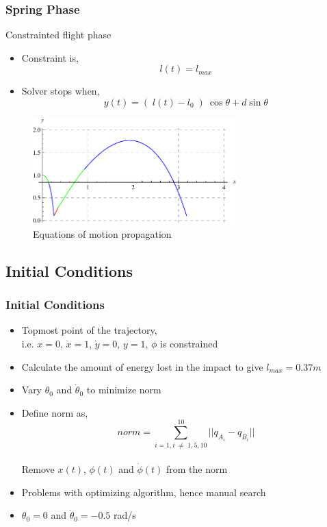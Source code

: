 \begin{frame}
\frametitle{Spring Phase}
\begin{block}{Constrainted flight phase}
\begin{itemize}
  \item
  Constraint is,
  \begin{equation*}
  l(t) = l_{max}
  \end{equation*}
  \item
  Solver stops when,
  \begin{equation*}
  y(t) = (\;l(t) - l_0\;)\:\cos \theta + d \sin \theta
  \end{equation*}

\end{itemize}
\end{block}
\vspace{0.1in}
\begin{figure}
\centering
\includegraphics[width=0.7\textwidth]{fig/plotG.pdf}
\caption{Equations of motion propagation}
\end{figure}
\end{frame}

\subsection*{Initial Conditions}
\begin{frame}
\frametitle{Initial Conditions}
\begin{itemize}
  \item 
  Topmost point of the trajectory,\\ i.e. $x = 0$, $\dot{x} = 1$, $\dot{y} = 0$, $y = 1$, $\phi$ is constrained\\[0.1in]
  \item
  Calculate the amount of energy lost in the impact to give $l_{max} = 0.37 m$\\[0.1in]
  \item
  Vary $\theta_0$ and $\dot{\theta}_0$ to minimize norm\\[0.1in]
  \item
  Define norm as,
  \begin{equation*}
  norm = \sum_{i = 1, i\;\neq\;1, 5, 10}^{10} || q_{A_i} - q_{B_i} ||
  \end{equation*}\\[0.1in]
  Remove $x(t)$, $\phi(t)$ and $\dot{\phi}(t)$ from the norm\\[0.1in]
  \item
  Problems with optimizing algorithm, hence manual search\\[0.1in]
  \item
  $\theta_0 = 0$ and $\dot{\theta}_0 = -0.5$ rad/s
\end{itemize}
\end{frame}

